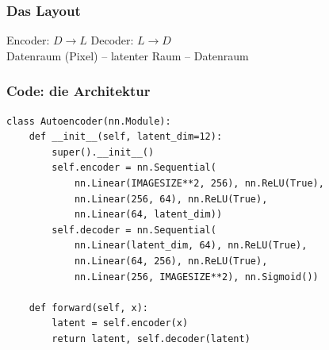 \begin{frame}
  \frametitle{Das Layout}

  \begin{center}
    \Large
    Encoder: $D \to L$ \qquad Decoder: $L \to D$\\[16pt]
    \normalsize Datenraum (Pixel) -- latenter Raum -- Datenraum
  \end{center}

\end{frame}

\begin{frame}[fragile]
  \frametitle{Code: die Architektur}

  \lstset{basicstyle=\ttfamily\scriptsize}
  \begin{lstlisting}
class Autoencoder(nn.Module):
    def __init__(self, latent_dim=12):
        super().__init__()
        self.encoder = nn.Sequential(
            nn.Linear(IMAGESIZE**2, 256), nn.ReLU(True),
            nn.Linear(256, 64), nn.ReLU(True),
            nn.Linear(64, latent_dim))
        self.decoder = nn.Sequential(
            nn.Linear(latent_dim, 64), nn.ReLU(True),
            nn.Linear(64, 256), nn.ReLU(True),
            nn.Linear(256, IMAGESIZE**2), nn.Sigmoid())

    def forward(self, x):
        latent = self.encoder(x)
        return latent, self.decoder(latent)
  \end{lstlisting}

\end{frame}

